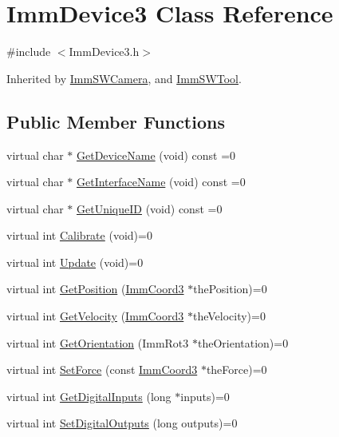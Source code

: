 \hypertarget{classImmDevice3}{
\section{ImmDevice3 Class Reference}
\label{classImmDevice3}
}


{\ttfamily \#include $<$ImmDevice3.h$>$}

Inherited by \hyperlink{classImmSWCamera}{ImmSWCamera}, and \hyperlink{classImmSWTool}{ImmSWTool}.\subsection*{Public Member Functions}
\begin{DoxyCompactItemize}
\item 
virtual char $\ast$ \hyperlink{classImmDevice3_ae9ce3e0bee3de88456247c158cece3de}{GetDeviceName} (void) const =0
\item 
virtual char $\ast$ \hyperlink{classImmDevice3_a7a827a9b1db6ed6f84147f3b266781ca}{GetInterfaceName} (void) const =0
\item 
virtual char $\ast$ \hyperlink{classImmDevice3_adc9ebc761484c239995fcdb4cd778f4c}{GetUniqueID} (void) const =0
\item 
virtual int \hyperlink{classImmDevice3_a2515bf1ac7e7e7f3a381f453356a0ac1}{Calibrate} (void)=0
\item 
virtual int \hyperlink{classImmDevice3_a3f2b0eff86139112fd69ac5adcc431df}{Update} (void)=0
\item 
virtual int \hyperlink{classImmDevice3_a6481f3b77eea4ee4f9d29aa5a109aa31}{GetPosition} (\hyperlink{structImmCoord3}{ImmCoord3} $\ast$thePosition)=0
\item 
virtual int \hyperlink{classImmDevice3_a5e54ca3f7d4ef1bc73f81505a930beac}{GetVelocity} (\hyperlink{structImmCoord3}{ImmCoord3} $\ast$theVelocity)=0
\item 
virtual int \hyperlink{classImmDevice3_a70c07b916e8a73a346b55c74f60685d0}{GetOrientation} (ImmRot3 $\ast$theOrientation)=0
\item 
virtual int \hyperlink{classImmDevice3_abac0c7165de45fd8336f5bf9ec617e7e}{SetForce} (const \hyperlink{structImmCoord3}{ImmCoord3} $\ast$theForce)=0
\item 
virtual int \hyperlink{classImmDevice3_a4898c71b383a2fc6cd86ea7983f9f14f}{GetDigitalInputs} (long $\ast$inputs)=0
\item 
virtual int \hyperlink{classImmDevice3_ac575b58d33998f0692b89429ada48c98}{SetDigitalOutputs} (long outputs)=0

\end{DoxyCompactItemize}
